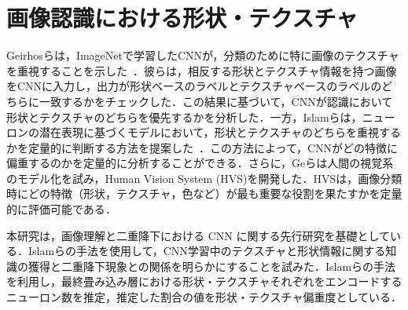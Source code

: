 \section{画像認識における形状・テクスチャ}
Geirhosらは，ImageNetで学習したCNNが，分類のために特に画像のテクスチャを重視することを示した~\cite{Geirhos}．彼らは，相反する形状とテクスチャ情報を持つ画像をCNNに入力し，出力が形状ベースのラベルとテクスチャベースのラベルのどちらに一致するかをチェックした．この結果に基づいて，CNNが認識において形状とテクスチャのどちらを優先するかを分析した．一方，Islamらは，ニューロンの潜在表現に基づくモデルにおいて，形状とテクスチャのどちらを重視するかを定量的に判断する方法を提案した~\cite{Islam}．この方法によって，CNNがどの特徴に偏重するのかを定量的に分析することができる．さらに，Geらは人間の視覚系のモデル化を試み，Human Vision System (HVS)を開発した．HVSは，画像分類時にどの特徴（形状，テクスチャ，色など）が最も重要な役割を果たすかを定量的に評価可能である\cite{Ge}．

本研究は，画像理解と二重降下における CNN に関する先行研究を基礎としている．Islamらの手法を使用して，CNN学習中のテクスチャと形状情報に関する知識の獲得と二重降下現象との関係を明らかにすることを試みた．Islamらの手法を利用し，最終畳み込み層における形状・テクスチャそれぞれをエンコードするニューロン数を推定，推定した割合の値を形状・テクスチャ偏重度としている．
\newpage